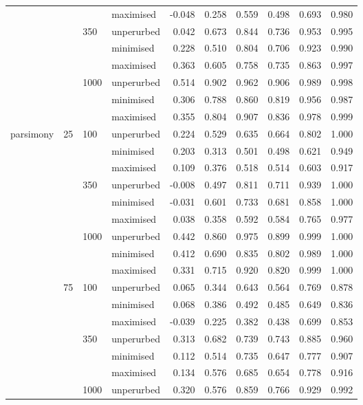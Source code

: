 \begin{longtable}{llllrrrrrr}
   &  &  & maximised & -0.048 & 0.258 & 0.559 & 0.498 & 0.693 & 0.980 \\ 
   &  & 350 & unperurbed & 0.042 & 0.673 & 0.844 & 0.736 & 0.953 & 0.995 \\ 
   &  &  & minimised & 0.228 & 0.510 & 0.804 & 0.706 & 0.923 & 0.990 \\ 
   &  &  & maximised & 0.363 & 0.605 & 0.758 & 0.735 & 0.863 & 0.997 \\ 
   &  & 1000 & unperurbed & 0.514 & 0.902 & 0.962 & 0.906 & 0.989 & 0.998 \\ 
   &  &  & minimised & 0.306 & 0.788 & 0.860 & 0.819 & 0.956 & 0.987 \\ 
   &  &  & maximised & 0.355 & 0.804 & 0.907 & 0.836 & 0.978 & 0.999 \\ 
  parsimony & 25 & 100 & unperurbed & 0.224 & 0.529 & 0.635 & 0.664 & 0.802 & 1.000 \\ 
   &  &  & minimised & 0.203 & 0.313 & 0.501 & 0.498 & 0.621 & 0.949 \\ 
   &  &  & maximised & 0.109 & 0.376 & 0.518 & 0.514 & 0.603 & 0.917 \\ 
   &  & 350 & unperurbed & -0.008 & 0.497 & 0.811 & 0.711 & 0.939 & 1.000 \\ 
   &  &  & minimised & -0.031 & 0.601 & 0.733 & 0.681 & 0.858 & 1.000 \\ 
   &  &  & maximised & 0.038 & 0.358 & 0.592 & 0.584 & 0.765 & 0.977 \\ 
   &  & 1000 & unperurbed & 0.442 & 0.860 & 0.975 & 0.899 & 0.999 & 1.000 \\ 
   &  &  & minimised & 0.412 & 0.690 & 0.835 & 0.802 & 0.989 & 1.000 \\ 
   &  &  & maximised & 0.331 & 0.715 & 0.920 & 0.820 & 0.999 & 1.000 \\ 
   & 75 & 100 & unperurbed & 0.065 & 0.344 & 0.643 & 0.564 & 0.769 & 0.878 \\ 
   &  &  & minimised & 0.068 & 0.386 & 0.492 & 0.485 & 0.649 & 0.836 \\ 
   &  &  & maximised & -0.039 & 0.225 & 0.382 & 0.438 & 0.699 & 0.853 \\ 
   &  & 350 & unperurbed & 0.313 & 0.682 & 0.739 & 0.743 & 0.885 & 0.960 \\ 
   &  &  & minimised & 0.112 & 0.514 & 0.735 & 0.647 & 0.777 & 0.907 \\ 
   &  &  & maximised & 0.134 & 0.576 & 0.685 & 0.654 & 0.778 & 0.916 \\ 
   &  & 1000 & unperurbed & 0.320 & 0.576 & 0.859 & 0.766 & 0.929 & 0.992 \\ 

\end{longtable}

